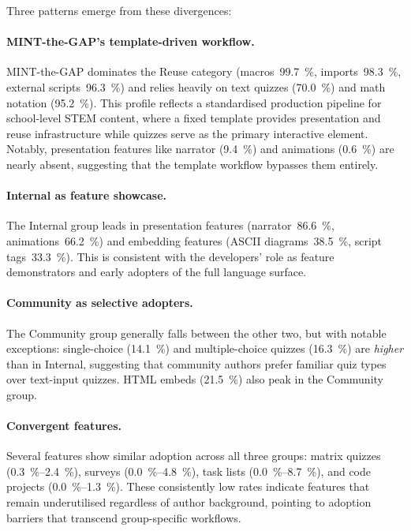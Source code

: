 Three patterns emerge from these divergences:

\paragraph{MINT-the-GAP's template-driven workflow.}
MINT-the-GAP dominates the Reuse category (macros~\SI{99.7}{\percent},
imports~\SI{98.3}{\percent}, external scripts~\SI{96.3}{\percent})
and relies heavily on text quizzes (\SI{70.0}{\percent}) and
math notation (\SI{95.2}{\percent}).
This profile reflects a standardised production pipeline for
school-level STEM content, where a fixed template provides presentation
and reuse infrastructure while quizzes serve as the primary interactive
element.
Notably, presentation features like narrator (\SI{9.4}{\percent}) and
animations (\SI{0.6}{\percent}) are nearly absent, suggesting that the
template workflow bypasses them entirely.

\paragraph{Internal as feature showcase.}
The Internal group leads in presentation features (narrator~\SI{86.6}{\percent},
animations~\SI{66.2}{\percent}) and embedding features
(ASCII diagrams~\SI{38.5}{\percent}, script tags~\SI{33.3}{\percent}).
This is consistent with the developers' role as feature demonstrators and
early adopters of the full language surface.

\paragraph{Community as selective adopters.}
The Community group generally falls between the other two, but with
notable exceptions: single-choice (\SI{14.1}{\percent}) and
multiple-choice quizzes (\SI{16.3}{\percent}) are \emph{higher} than
in Internal, suggesting that community authors prefer familiar quiz
types over text-input quizzes.
HTML embeds (\SI{21.5}{\percent}) also peak in the Community group.

\paragraph{Convergent features.}
Several features show similar adoption across all three groups:
matrix quizzes (\SIrange{0.3}{2.4}{\percent}), surveys
(\SIrange{0.0}{4.8}{\percent}), task lists (\SIrange{0.0}{8.7}{\percent}),
and code projects (\SIrange{0.0}{1.3}{\percent}).
These consistently low rates indicate features that remain underutilised
regardless of author background, pointing to adoption barriers that
transcend group-specific workflows.
